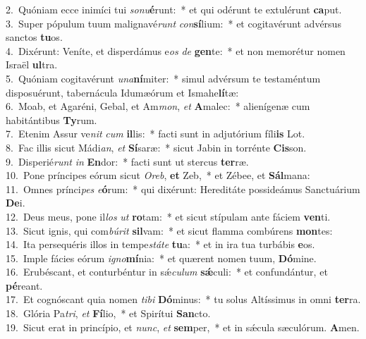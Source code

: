 {2.~}Quóniam ecce inimíci tui \textit{so}\textit{nu}\textbf{é}runt:~* et qui odérunt te extulérunt \textbf{ca}put.\\
{3.~}Super pópulum tuum malignavé\textit{runt} \textit{con}\textbf{sí}lium:~* et cogitavérunt advérsus sanctos \textbf{tu}os.\\
{4.~}Dixérunt: Veníte, et disperdámus e\textit{os} \textit{de} \textbf{gen}te:~* et non memorétur nomen Israël \textbf{ul}tra.\\
{5.~}Quóniam cogitavérunt \textit{u}\textit{na}\textbf{ní}miter:~* simul advérsum te testaméntum disposuérunt, tabernácula Idumæórum et Ismahe\textbf{lí}tæ:\\
{6.~}Moab, et Agaréni, Gebal, et Am\textit{mon}, \textit{et} \textbf{A}malec:~* alienígenæ cum habitántibus \textbf{Ty}rum.\\
{7.~}Etenim Assur ve\textit{nit} \textit{cum} \textbf{il}lis:~* facti sunt in adjutórium fíli\textbf{is} Lot.\\
{8.~}Fac illis sicut Mádi\textit{an}, \textit{et} \textbf{Sí}saræ:~* sicut Jabin in torrénte \textbf{Cis}son.\\
{9.~}Disperié\textit{runt} \textit{in} \textbf{En}dor:~* facti sunt ut stercus \textbf{ter}ræ.\\
{10.~}Pone príncipes eórum sicut \textit{O}\textit{reb}, \textbf{et} Zeb,~* et Zébee, et \textbf{Sál}mana:\\
{11.~}Omnes prínci\textit{pes} \textit{e}\textbf{ó}rum:~* qui dixérunt: Hereditáte possideámus Sanctuárium \textbf{De}i.\\
{12.~}Deus meus, pone il\textit{los} \textit{ut} \textbf{ro}tam:~* et sicut stípulam ante fáciem \textbf{ven}ti.\\
{13.~}Sicut ignis, qui com\textit{bú}\textit{rit} \textbf{sil}vam:~* et sicut flamma combúrens \textbf{mon}tes:\\
{14.~}Ita persequéris illos in tempe\textit{stá}\textit{te} \textbf{tu}a:~* et in ira tua turbábis \textbf{e}os.\\
{15.~}Imple fácies eórum \textit{i}\textit{gno}\textbf{mí}nia:~* et quærent nomen tuum, \textbf{Dó}mine.\\
{16.~}Erubéscant, et conturbéntur in sǽ\textit{cu}\textit{lum} \textbf{sǽ}culi:~* et confundántur, et \textbf{pé}reant.\\
{17.~}Et cognóscant quia nomen \textit{ti}\textit{bi} \textbf{Dó}minus:~* tu solus Altíssimus in omni \textbf{ter}ra.\\
{18.~}Glória Pa\textit{tri}, \textit{et} \textbf{Fí}lio,~* et Spirítui \textbf{San}cto.\\
{19.~}Sicut erat in princípio, et \textit{nunc}, \textit{et} \textbf{sem}per,~* et in sǽcula sæculórum. \textbf{A}men.\\
